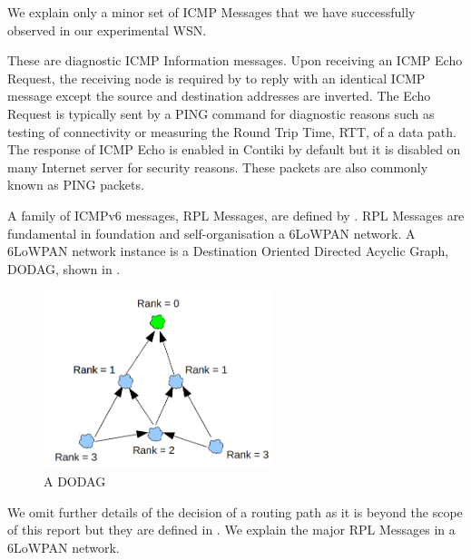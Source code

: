We explain only a minor set of ICMP Messages that we have successfully observed in our experimental WSN.
\begin{description}[style=nextline]
	\item[\textbf{Echo Request and Reply Messages}]
	These are diagnostic ICMP Information messages. Upon receiving an ICMP Echo Request, the receiving node is required by \cite{rfc4443} to reply with an identical ICMP message except the source and destination addresses are inverted. The Echo Request is typically sent by a PING command for diagnostic reasons such as testing of connectivity or measuring the Round Trip Time, RTT, of a data path. The response of ICMP Echo is enabled in Contiki by default but it is disabled on many Internet server for security reasons. These packets are also commonly known as PING packets.
	
	\item[\textbf{RPL Messages}]
	A family of ICMPv6 messages, RPL Messages, are defined by \cite{rfc6550}. RPL Messages are fundamental in foundation and self-organisation a 6LoWPAN network. A 6LoWPAN network instance is a Destination Oriented Directed Acyclic Graph, DODAG, shown in . 

	\begin{figure}[h!]
		\center
		\includegraphics[width=0.6\textwidth]{fig/dodag.png}
		\caption{A DODAG}
		\label{Fig: DODAG}
	\end{figure}
	
	We omit further details of the decision of a routing path as it is beyond the scope of this report but they are defined in \cite{rfc6550}. We explain the major RPL Messages in a 6LoWPAN network.
	

\end{description}
